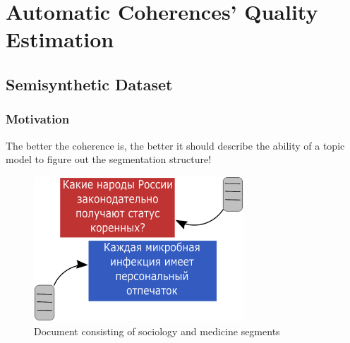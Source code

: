\documentclass[russian]{beamer}
\begin{document}
\section{Automatic Coherences' Quality Estimation}


\subsection{Semisynthetic Dataset}
\begin{frame}
  \frametitle{Motivation}
  \begin{block}{}
    The better the coherence is, the better it should describe the ability of a topic model to figure out the segmentation structure!
  \end{block}   
  \begin{figure}[h]
    \centering
    \includegraphics[width=0.7\textwidth, height=0.5\textheight]{pn_gen_diagram.eps}
    \caption*{Document consisting of sociology and medicine segments}
  \end{figure}    
\end{frame}
\end{document}

